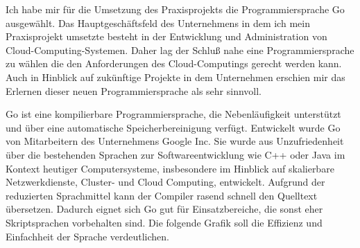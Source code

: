 \documentclass[12pt]{article}
\begin{document}
Ich habe mir für die Umsetzung des Praxisprojekts die Programmiersprache Go ausgewählt.
Das Hauptgeschäftsfeld des Unternehmens in dem ich mein Praxisprojekt umsetzte besteht in der Entwicklung und Administration von Cloud-Computing-Systemen. Daher lag der Schluß nahe eine Programmiersprache zu wählen die den Anforderungen des Cloud-Computings gerecht werden kann. Auch in Hinblick auf zukünftige Projekte in dem Unternehmen erschien mir das Erlernen dieser neuen Programmiersprache als sehr sinnvoll.

Go ist eine kompilierbare Programmiersprache, die Nebenläufigkeit unterstützt und über eine automatische Speicherbereinigung verfügt. Entwickelt wurde Go von Mitarbeitern des Unternehmens Google Inc. Sie wurde aus Unzufriedenheit über die bestehenden Sprachen zur Softwareentwicklung wie C++ oder Java im Kontext heutiger Computersysteme, insbesondere im Hinblick auf skalierbare Netzwerkdienste, Cluster- und Cloud Computing, entwickelt. Aufgrund der reduzierten Sprachmittel kann der Compiler rasend schnell den Quelltext übersetzen. Dadurch eignet sich Go gut für Einsatzbereiche, die sonst eher Skriptsprachen vorbehalten sind. Die folgende Grafik soll die Effizienz und Einfachheit der Sprache verdeutlichen.


\end{document}
